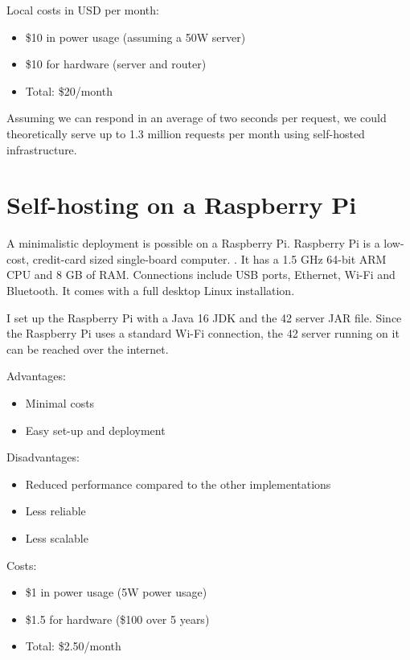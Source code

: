 Local costs in USD per month:

\begin{itemize}
\item \$10 in power usage (assuming a 50W server)
\item \$10 for hardware (server and router)
\item Total: \$20/month
\end{itemize}

Assuming we can respond in an average of two seconds per request, we could theoretically serve up to 1.3 million requests per month using self-hosted infrastructure.

\section{Self-hosting on a Raspberry Pi}

A minimalistic deployment is possible on a Raspberry Pi. Raspberry Pi is a low-cost, credit-card sized single-board computer. \cite{raspberry-pi-foundation-2015}. It has a 1.5 GHz 64-bit ARM CPU and 8 GB of RAM. Connections include USB ports, Ethernet, Wi-Fi and Bluetooth. It comes with a full desktop Linux installation.

I set up the Raspberry Pi with a Java 16 JDK and the 42 server JAR file. Since the Raspberry Pi uses a standard Wi-Fi connection, the 42 server running on it can be reached over the internet.


Advantages:

\begin{itemize}
\item Minimal costs
\item Easy set-up and deployment
\end{itemize}

Disadvantages:

\begin{itemize}
\item Reduced performance compared to the other implementations
\item Less reliable
\item Less scalable
\end{itemize}

Costs:

\begin{itemize}
\item \$1 in power usage (5W power usage) \cite{neukirchen-2021}
\item \$1.5 for hardware (\$100 over 5 years)
\item Total: \$2.50/month
\end{itemize}

